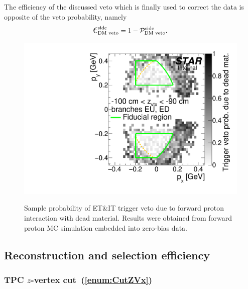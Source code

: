 The efficiency of the discussed veto which is finally used to correct the data is opposite of the veto probability, namely
\begin{equation}
 \mbox{\LARGE$\epsilon$}_{\text{DM~veto}}^{\text{side}} = 1 - \mathcal{P}_{\text{DM~veto}}^{\text{side}}.
\end{equation}

\begin{figure}[ht!]
\centering%
\parbox{0.4725\textwidth}{%
  \centering%
  \includegraphics[width=\linewidth,page=10]{graphics/corrections/mcDeadMatProbPxPy.pdf}\label{fig:sampleDeadMatVetoProb}
}%
\quad%
\parbox{0.4725\textwidth}{%
    \caption[Sample probability of ET\&IT trigger veto due to forward proton interaction with dead material.]{Sample probability of ET\&IT trigger veto due to forward proton interaction with dead material. Results were obtained from forward proton MC simulation embedded into zero-bias data.}\label{fig:sampleRpDeadMatVeto}%
}
\end{figure}






\subsection{Reconstruction and selection efficiency}\label{sec:cutsEff}
\subsubsection{TPC \texorpdfstring{$z$}{z}-vertex cut~(\ref{enum:CutZVx})}

